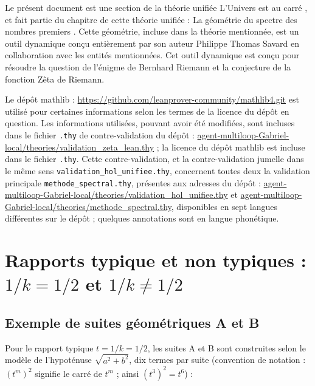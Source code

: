 \documentclass[11pt,a4paper]{article}
\begin{document}
Le présent document est une section de la théorie unifiée \og L'Univers est au
carré \fg{}, et fait partie du chapitre de cette théorie unifiée : \og La
géométrie du spectre des nombres premiers \fg{}. Cette géométrie, incluse dans
la théorie mentionnée, est un outil dynamique conçu entièrement par son auteur
Philippe Thomas Savard en collaboration avec les entités mentionnées. Cet outil
dynamique est conçu pour résoudre la question de l'énigme de Bernhard Riemann
et la conjecture de la fonction Zêta de Riemann.

Le dépôt mathlib : \url{https://github.com/leanprover-community/mathlib4.git}
est utilisé pour certaines informations selon les termes de la licence du dépôt
en question. Les informations utilisées, pouvant avoir été modifiées, sont
incluses dans le fichier \texttt{.thy} de contre-validation du dépôt :
\url{agent-multiloop-Gabriel-local/theories/validation_zeta_lean.thy} ; la
licence du dépôt mathlib est incluse dans le fichier \texttt{.thy}. Cette
contre-validation, et la contre-validation jumelle dans le même sens
\texttt{validation\_hol\_unifiee.thy}, concernent toutes deux la validation
principale \texttt{methode\_spectral.thy}, présentes aux adresses du dépôt :
\url{agent-multiloop-Gabriel-local/theories/validation_hol_unifiee.thy} et
\url{agent-multiloop-Gabriel-local/theories/methode_spectral.thy},
disponibles en sept langues différentes sur le dépôt ; quelques annotations
sont en langue phonétique.

\tableofcontents
\newpage

\section{Rapports typique et non typiques : $1/k = 1/2$ et $1/k \neq 1/2$}

\subsection{Exemple de suites géométriques A et B}

Pour le rapport typique $t = 1/k = 1/2$, les suites A et B sont construites
selon le modèle de l'hypoténuse $\sqrt{a^{2}+b^{2}}$, dix termes par suite
(convention de notation : $(t^{m})^{2}$ signifie le carré de $t^{m}$ ; ainsi
$(t^{3})^{2} = t^{6}$) :
\end{document}
